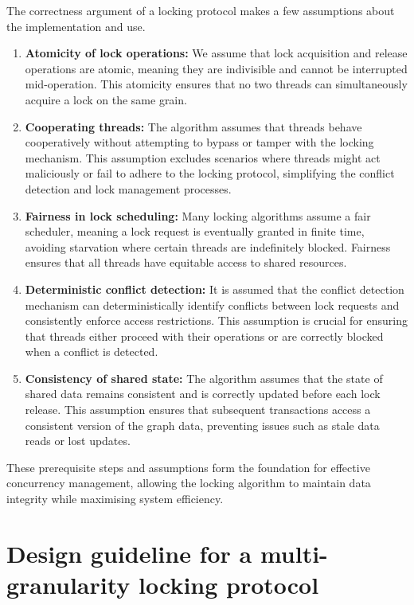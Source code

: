 The correctness argument of a locking protocol makes a few assumptions about the implementation and use.

\begin{enumerate}
    \item \textbf{Atomicity of lock operations:} We assume that lock acquisition and release operations are atomic, meaning they are indivisible and cannot be interrupted mid-operation. This atomicity ensures that no two threads can simultaneously acquire a lock on the same grain.

    \item \textbf{Cooperating threads:} The algorithm assumes that threads behave cooperatively without attempting to bypass or tamper with the locking mechanism. This assumption excludes scenarios where threads might act maliciously or fail to adhere to the locking protocol, simplifying the conflict detection and lock management processes.
    
    \item  \textbf{Fairness in lock scheduling:} Many locking algorithms assume a fair scheduler, meaning a lock request is eventually granted in finite time, avoiding starvation where certain threads are indefinitely blocked. Fairness ensures that all threads have equitable access to shared resources.

    \item \textbf{Deterministic conflict detection:}  It is assumed that the conflict detection mechanism can deterministically identify conflicts between lock requests and consistently enforce access restrictions. This assumption is crucial for ensuring that threads either proceed with their operations or are correctly blocked when a conflict is detected.
    
    \item \textbf{Consistency of shared state:} The algorithm assumes that the state of shared data remains consistent and is correctly updated before each lock release. This assumption ensures that subsequent transactions access a consistent version of the graph data, preventing issues such as stale data reads or lost updates.
\end{enumerate}


These prerequisite steps and assumptions form the foundation for effective concurrency management, allowing the locking algorithm to maintain data integrity while maximising system efficiency.



\section{Design guideline for a multi-granularity locking protocol} \label{sec:requirements}


